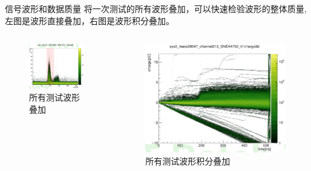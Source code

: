 \documentclass[11pt,compress,xcolor=x11names,UTF8]{beamer}
\begin{document}
\begin{frame}{信号波形和数据质量}
将一次测试的所有波形叠加，可以快速检验波形的整体质量,左图是波形直接叠加，右图是波形积分叠加。
\begin{columns}
\begin{column}{.5\textwidth}
\begin{figure}
\centering
\includegraphics[width=\textwidth]{figures/wave2d.png} %
\caption{所有测试波形叠加}
\end{figure}
\end{column}
\begin{column}{.5\textwidth}
\begin{figure}
\centering
\includegraphics[width=\textwidth]{figures/baseline2d.png} %
\caption{所有测试波形积分叠加}
\end{figure}
\end{column}
\end{columns}
\end{frame}
\end{document}
